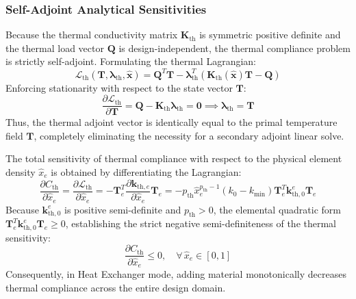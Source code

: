 \documentclass[11pt, a4paper]{article}
\begin{document}
\subsubsection{Self-Adjoint Analytical Sensitivities}
Because the thermal conductivity matrix $\mathbf{K}_{\text{th}}$ is symmetric positive definite and the thermal load vector $\mathbf{Q}$ is design-independent, the thermal compliance problem is strictly self-adjoint. Formulating the thermal Lagrangian:
\begin{equation}
\mathcal{L}_{\text{th}}(\mathbf{T}, \boldsymbol{\lambda}_{\text{th}}, \hat{\mathbf{x}}) = \mathbf{Q}^T \mathbf{T} - \boldsymbol{\lambda}_{\text{th}}^T \left( \mathbf{K}_{\text{th}}(\hat{\mathbf{x}}) \mathbf{T} - \mathbf{Q} \right)
\end{equation}
Enforcing stationarity with respect to the state vector $\mathbf{T}$:
\begin{equation}
\frac{\partial \mathcal{L}_{\text{th}}}{\partial \mathbf{T}} = \mathbf{Q} - \mathbf{K}_{\text{th}} \boldsymbol{\lambda}_{\text{th}} = \mathbf{0} \implies \boldsymbol{\lambda}_{\text{th}} = \mathbf{T}
\end{equation}
Thus, the thermal adjoint vector is identically equal to the primal temperature field $\mathbf{T}$, completely eliminating the necessity for a secondary adjoint linear solve.

The total sensitivity of thermal compliance with respect to the physical element density $\hat{x}_e$ is obtained by differentiating the Lagrangian:
\begin{equation}
\frac{\partial C_{\text{th}}}{\partial \hat{x}_e} = \frac{\partial \mathcal{L}_{\text{th}}}{\partial \hat{x}_e} = - \mathbf{T}_e^T \frac{\partial \mathbf{k}_{\text{th}, e}}{\partial \hat{x}_e} \mathbf{T}_e = - p_{\text{th}} \hat{x}_e^{p_{\text{th}}-1} (k_0 - k_{\min}) \mathbf{T}_e^T \mathbf{k}_{\text{th}, 0}^e \mathbf{T}_e
\end{equation}
Because $\mathbf{k}_{\text{th}, 0}^e$ is positive semi-definite and $p_{\text{th}} > 0$, the elemental quadratic form $\mathbf{T}_e^T \mathbf{k}_{\text{th}, 0}^e \mathbf{T}_e \ge 0$, establishing the strict negative semi-definiteness of the thermal sensitivity:
\begin{equation}
\frac{\partial C_{\text{th}}}{\partial \hat{x}_e} \le 0, \quad \forall \, \hat{x}_e \in [0, 1]
\end{equation}
Consequently, in Heat Exchanger mode, adding material monotonically decreases thermal compliance across the entire design domain.
\end{document}
